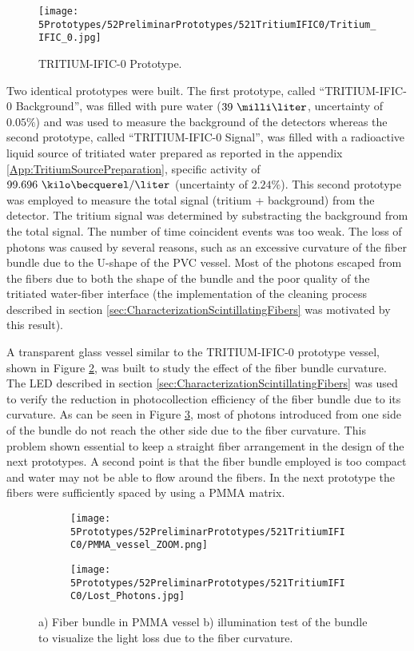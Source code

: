 \begin{figure}[h]
\centering
\texttt{[image: 5Prototypes/52PreliminarPrototypes/521TritiumIFIC0/Tritium\_IFIC\_0.jpg]}
\caption{TRITIUM-IFIC-0 Prototype.\label{fig:TritiumIFIC0}}
\end{figure}

Two identical prototypes were built. The first prototype, called ``TRITIUM-IFIC-0 Background'', was filled with pure water ($39~\milli\liter$, uncertainty of $0.05\%$) and was used to measure the background of the detectors whereas the second prototype, called ``TRITIUM-IFIC-0 Signal'', was filled with a radioactive liquid source of tritiated water prepared as reported in the appendix \ref{App:TritiumSourcePreparation}, specific activity of $99.696~\kilo\becquerel/\liter$ (uncertainty of $2.24\%$). This second prototype was employed to measure the total signal (tritium + background) from the detector. The tritium signal was determined by substracting the background from the total signal. The number of time coincident events was too weak. The loss of photons was caused by several reasons, such as an excessive curvature of the fiber bundle due to the U-shape of the PVC vessel. Most of the photons escaped from the fibers due to both the shape of the bundle and the poor quality of the tritiated water-fiber interface (the implementation of the cleaning process described in section \ref{sec:CharacterizationScintillatingFibers} was motivated by this result). 

A transparent glass vessel similar to the TRITIUM-IFIC-0 prototype vessel, shown in Figure \ref{subfig:PMMAVesselToTestLostPhotons}, was built to study the effect of the fiber bundle curvature. The LED described in section \ref{sec:CharacterizationScintillatingFibers} was used to verify the reduction in photocollection efficiency of the fiber bundle due to its curvature. As can be seen in Figure \ref{subfig:TestLostPhotons}, most of photons introduced from one side of the bundle do not reach the other side due to the fiber curvature. This problem shown essential to keep a straight fiber arrangement in the design of the next prototypes. A second point is that the fiber bundle employed is too compact and water may not be able to flow around the fibers. In the next prototype the fibers were sufficiently spaced by using a PMMA matrix.

\begin{figure}
\centering
    \begin{subfigure}[b]{0.45\textwidth}
    \centering
    \texttt{[image: 5Prototypes/52PreliminarPrototypes/521TritiumIFIC0/PMMA\_vessel\_ZOOM.png]}  
    \caption{\label{subfig:PMMAVesselToTestLostPhotons}}
    \end{subfigure}
    \hfill
    \begin{subfigure}[b]{0.45\textwidth}
    \centering
    \texttt{[image: 5Prototypes/52PreliminarPrototypes/521TritiumIFIC0/Lost\_Photons.jpg]}  
    \caption{\label{subfig:TestLostPhotons}}
    \end{subfigure}
 \caption{a) Fiber bundle in PMMA vessel b) illumination test of the bundle to visualize the light loss due to the fiber curvature.}
 \label{fig:TestLostPhotons}
\end{figure}

